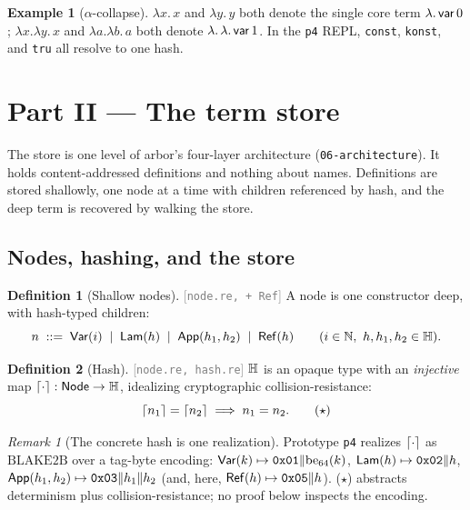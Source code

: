 \documentclass[11pt]{article}
\theoremstyle{definition}
\newtheorem{definition}{Definition}[section]
\newtheorem{example}{Example}[section]
\theoremstyle{plain}
\theoremstyle{remark}
\newtheorem{remark}{Remark}[section]
\newcommand{\src}[1]{{\footnotesize\textcolor{gray}{[\texttt{#1}]}}}
\begin{document}
\begin{example}[$\alpha$-collapse]\label{ex:alpha}
$\lambda x.\,x$ and $\lambda y.\,y$ both denote the single core term $\lambda.\,\mathsf{var}\,0$;
$\lambda x.\lambda y.\,x$ and $\lambda a.\lambda b.\,a$ both denote $\lambda.\,\lambda.\,\mathsf{var}\,1$. In the
\texttt{p4} REPL, \texttt{const}, \texttt{konst}, and \texttt{tru} all resolve to one hash.
\end{example}

\section{Part II --- The term store}\label{sec:store}

The store is one level of arbor's four-layer architecture (\texttt{06-architecture}). It holds
content-addressed definitions and nothing about names. Definitions are stored shallowly, one
node at a time with children referenced by hash, and the deep term is recovered by walking the
store.

\subsection{Nodes, hashing, and the store}

\begin{definition}[Shallow nodes]\label{def:node}
\src{node.re, +\,Ref} A node is one constructor deep, with hash-typed children:
\[
  n \;::=\; \mathsf{Var}(i) \;\mid\; \mathsf{Lam}(h) \;\mid\; \mathsf{App}(h_1,h_2) \;\mid\; \mathsf{Ref}(h)
  \qquad (i \in \mathbb{N},\ h,h_1,h_2 \in \mathbb{H}).
\]
\end{definition}

\begin{definition}[Hash]\label{def:hash}
\src{node.re, hash.re} $\mathbb{H}$ is an opaque type with an \emph{injective} map
$\lceil \cdot \rceil : \mathsf{Node} \to \mathbb{H}$, idealizing cryptographic collision-resistance:
\[
  \lceil n_1 \rceil = \lceil n_2 \rceil \;\Longrightarrow\; n_1 = n_2. \tag{$\star$}
\]
\end{definition}

\begin{remark}[The concrete hash is one realization]\label{rem:concrete-hash}
Prototype \texttt{p4} realizes $\lceil \cdot \rceil$ as $\mathrm{BLAKE2B}$ over a tag-byte encoding:
$\mathsf{Var}(k)\mapsto \mathtt{0x01}\Vert\mathrm{be}_{64}(k)$,
$\mathsf{Lam}(h)\mapsto \mathtt{0x02}\Vert h$,
$\mathsf{App}(h_1,h_2)\mapsto \mathtt{0x03}\Vert h_1\Vert h_2$
(and, here, $\mathsf{Ref}(h)\mapsto \mathtt{0x05}\Vert h$). ($\star$) abstracts determinism plus
collision-resistance; no proof below inspects the encoding.
\end{remark}
\end{document}
